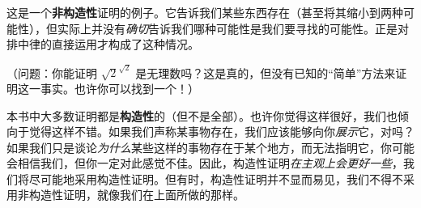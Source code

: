 这是一个\textbf{非构造性}证明的例子。它告诉我们某些东西存在（甚至将其缩小到两种可能性），但实际上并没有\emph{确切}告诉我们哪种可能性是我们要寻找的可能性。正是对排中律的直接运用才构成了这种情况。

（问题：你能证明 $\sqrt{2}^{\sqrt{2}}$ 是无理数吗？这是真的，但没有已知的``简单''方法来证明这一事实。也许你可以找到一个！）

本书中大多数证明都是\textbf{构造性}的（但不是全部）。也许你觉得这样很好，我们也倾向于觉得这样不错。如果我们声称某事物存在，我们应该能够向你\emph{展示}它，对吗？如果我们只是谈论\emph{为什么}某些这样的事物存在于某个地方，而无法指明它，你可能会相信我们，但你一定对此感觉不佳。因此，构造性证明\emph{在主观上会更好一些}，我们将尽可能地采用构造性证明。但有时，构造性证明并不显而易见，我们不得不采用非构造性证明，就像我们在上面所做的那样。
